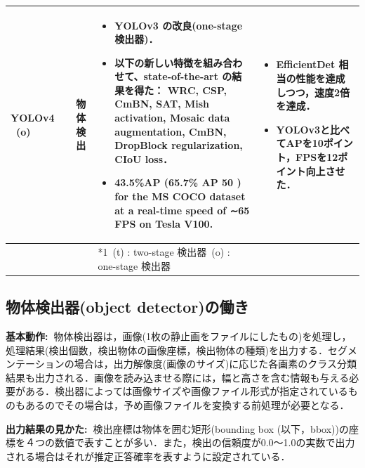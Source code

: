 \documentclass[originalpaper]{jsaiart}     %
\begin{document}
\begin{table}
\begin{center}
\begin{tabularx}{\linewidth}{Xp{1.5cm}Xp{7cm}X}
            YOLOv4 \ (o) & \cite{BWL20} & 物体検出 & 
            \begin{itemize}
                \vspace{-0.7\baselineskip}
                \setlength{\leftskip}{-3mm}
                \item YOLOv3 の改良(one-stage 検出器)．
                \item 以下の新しい特徴を組み合わせて、state-of-the-art の結果を得た： WRC, CSP, CmBN, SAT, Mish activation, Mosaic data augmentation, CmBN, DropBlock regularization, CIoU loss．
                \item 43.5\%AP (65.7\% AP 50 ) for the MS COCO dataset at a real-time speed of ∼65 FPS on Tesla V100.
            \end{itemize}
            &
            \begin{itemize}
                \vspace{-0.7\baselineskip}
                \setlength{\leftskip}{-3mm}
                \item EfficientDet 相当の性能を達成しつつ，速度2倍を達成．
                \item YOLOv3と比べてAPを10ポイント，FPSを12ポイント向上させた．
            \end{itemize}
            \\
            \bottomrule
             &  &  & *1\ (t) : two-stage 検出器\quad *2\ (o) : one-stage 検出器 &  \\
        \end{tabularx}
    \end{center}
\end{table}%

\subsection{物体検出器(object detector)の働き}
{\bf 基本動作:\ }物体検出器は，画像(1枚の静止画をファイルにしたもの)を処理し，処理結果(検出個数，検出物体の画像座標，検出物体の種類)を出力する．セグメンテーションの場合は，出力解像度(画像のサイズ)に応じた各画素のクラス分類結果も出力される．画像を読み込ませる際には，幅と高さを含む情報も与える必要がある．検出器によっては画像サイズや画像ファイル形式が指定されているものもあるのでその場合は，予め画像ファイルを変換する前処理が必要となる．

{\bf 出力結果の見かた:\ }検出座標は物体を囲む矩形(bounding box (以下，bbox))の座標を４つの数値で表すことが多い．また，検出の信頼度が0.0〜1.0の実数で出力される場合はそれが推定正答確率を表すように設定されている．
\end{document}
